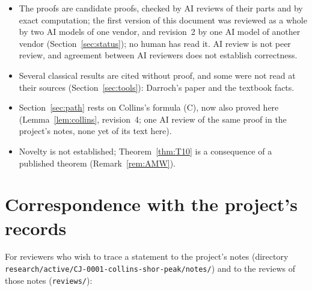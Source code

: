 \documentclass[11pt]{amsart}
\theoremstyle{definition}
\theoremstyle{remark}
\begin{document}
\begin{itemize}
\item The proofs are candidate proofs, checked by AI reviews of their parts
and by exact computation; the first version of this document was reviewed
as a whole by two AI models of one vendor, and revision~2 by one AI model of
another vendor (Section~\ref{sec:status}); no human has read it. AI review
is not peer review, and agreement between AI reviewers does not establish
correctness.
\item Several classical results are cited without proof, and some were not
read at their sources (Section~\ref{sec:tools}): Darroch's paper and the
textbook facts.
\item Section~\ref{sec:path} rests on Collins's formula (C), now also proved
here (Lemma~\ref{lem:collins}, revision~4; one AI review of the same proof
in the project's notes, none yet of its text here).
\item Novelty is not established; Theorem~\ref{thm:T10} is a consequence
of a published theorem (Remark~\ref{rem:AMW}).
\end{itemize}

\appendix

\section{Correspondence with the project's records}\label{app:map}

For reviewers who wish to trace a statement to the project's notes
(directory \nolinkurl{research/active/CJ-0001-collins-shor-peak/notes/}) and to
the reviews of those notes (\nolinkurl{reviews/}):
\end{document}
